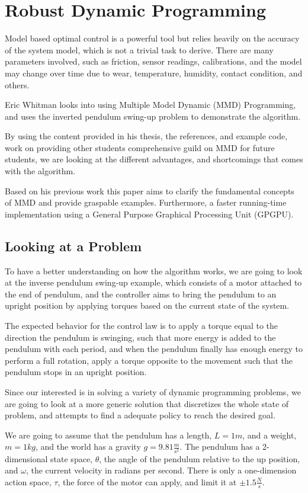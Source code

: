\documentclass{article}
\begin{document}
\section{Robust Dynamic Programming}
Model based optimal control is a powerful tool but relies heavily on the accuracy of the system model, which is not a trivial task to derive. There are many parameters involved, such as friction, sensor readings, calibrations, and the model may change over time due to wear, temperature, humidity, contact condition, and others.

Eric Whitman looks into using Multiple Model Dynamic (MMD) Programming, and uses the inverted pendulum swing-up problem to demonstrate the algorithm. \cite{eric_thesis}
 
By using the content provided in his thesis, the references, and example code, work on providing other students comprehensive guild on MMD for future students, we are looking at the different advantages, and shortcomings that comes with the algorithm.

Based on his previous work this paper aims to clarify the fundamental concepts of MMD and provide graspable examples. Furthermore, a faster running-time implementation using a General Purpose Graphical Processing Unit (GPGPU).

\subsection{Looking at a Problem}
To have a better understanding on how the algorithm works, we are going to look at the  inverse pendulum swing-up example, which consists of a motor attached to the end of pendulum, and the controller aims to bring the pendulum to an upright position by applying torques based on the current state of the system. 

The expected behavior for the control law is to apply a torque equal to the direction the pendulum is swinging, such that more energy is added to the pendulum with each period, and when the pendulum finally has enough energy to perform a full rotation, apply a torque opposite to the movement such that the pendulum stops in an upright position.  

Since our interested is in solving a variety of dynamic programming problems, we are going to look at a more generic solution that discretizes the whole state of problem, and attempts to find a adequate policy to reach the desired goal.

We are going to assume that the pendulum has a length, $L=1m$, and a weight, $m=1kg$, and the world has a gravity $g=9.81\frac{m}{s^2}$. The pendulum has a 2-dimensional state space, $\theta$, the angle of the pendulum relative to the up position, and $\omega$, the current velocity in radians per second. There is only a one-dimension action space, $\tau$, the force of the motor can apply, and limit it at $\pm 1.5 \frac{N}{s}$.
\end{document}
